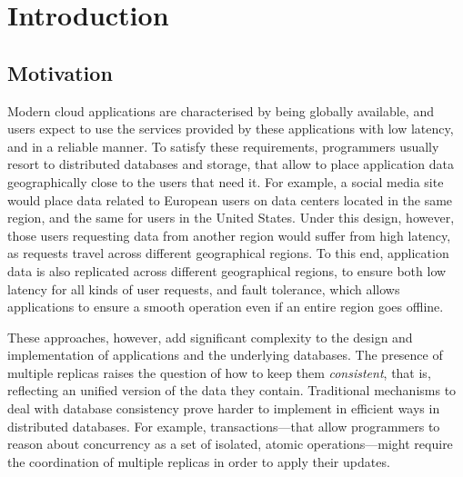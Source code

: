 \cleardoublepage
\chapter{Introduction}
\label{chapter:introduction}


\section{Motivation}

Modern cloud applications are characterised by being globally available, and users expect to use the services provided by these applications with low latency, and in a reliable manner. To satisfy these requirements, programmers usually resort to distributed databases and storage, that allow to place application data geographically close to the users that need it. For example, a social media site would place data related to European users on data centers located in the same region, and the same for users in the United States. Under this design, however, those users requesting data from another region would suffer from high latency, as requests travel across different geographical regions. To this end, application data is also replicated across different geographical regions, to ensure both low latency for all kinds of user requests, and fault tolerance, which allows applications to ensure a smooth operation even if an entire region goes offline.

These approaches, however, add significant complexity to the design and implementation of applications and the underlying databases. The presence of multiple replicas raises the question of how to keep them \emph{consistent}, that is, reflecting an unified version of the data they contain. Traditional mechanisms to deal with database consistency prove harder to implement in efficient ways in distributed databases. For example, transactions---that allow programmers to reason about concurrency as a set of isolated, atomic operations---might require the coordination of multiple replicas in order to apply their updates.

